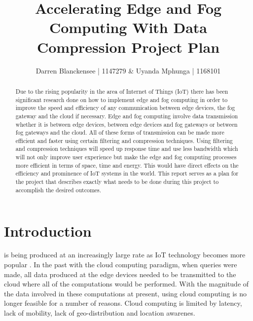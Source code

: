 \documentclass[11pt,journal, a4paper]{IEEEtran}
\title{\LARGE {Accelerating Edge and Fog Computing With Data Compression Project Plan}}
\author{\small {Darren Blanckensee | 1147279 \& Uyanda Mphunga | 1168101 }}
\begin{document}
	
	\maketitle


\begin{abstract}
Due to the rising popularity in the area of Internet of Things (IoT) there has been significant research done on how to implement edge and fog computing in order to improve the speed and efficiency of any communication between edge devices, the fog gateway and the cloud if necessary. Edge and fog computing involve data transmission whether it is between edge devices, between edge devices and fog gateways or between fog gateways and the cloud. All of these forms of transmission can be made more efficient and faster using certain filtering and compression techniques. Using filtering and compression techniques will speed up response time and use less bandwidth which  will not only improve user experience but make the edge and fog computing processes more efficient in terms of space, time and energy. This would have direct effects on the efficiency and prominence of IoT systems in the world. This report serves as a plan for the project that describes exactly what needs to be done during this project to accomplish the desired outcomes.
\end{abstract}



\section{Introduction}
\noindent
{} is being produced at an increasingly large rate as IoT technology becomes more popular \cite{primer}. In the past with the cloud computing paradigm, when queries were made, all data produced at the edge devices needed to be transmitted to the cloud where all of the computations would be performed. With the magnitude of the data involved in these computations at present, using cloud computing is no longer feasible for a number of reasons. Cloud computing is limited by latency, lack of mobility, lack of geo-distribution and location awarenes\cite{I1}. \\
\end{document}
